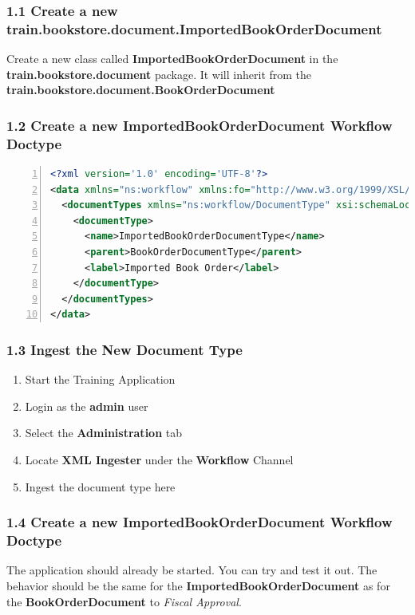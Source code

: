\subsubsection*{1.1 Create a new
  train.bookstore.document.ImportedBookOrderDocument}
Create a new class called \textbf{ImportedBookOrderDocument} in the
\textbf{train.bookstore.document} package. It will inherit from the
\textbf{train.bookstore.document.BookOrderDocument}

\subsubsection*{1.2 Create a new ImportedBookOrderDocument Workflow
  Doctype}
\begin{lstlisting}[numbers=left,language=xml,basicstyle=\scriptsize,backgroundcolor=\color{ubergray},caption={New
  ImportedBookOrderDocumentType},frame=single,breaklines=true]
<?xml version='1.0' encoding='UTF-8'?> 
<data xmlns="ns:workflow" xmlns:fo="http://www.w3.org/1999/XSL/Format" xmlns:xsi="http://www.w3.org/2001/XMLSchema-instance" xsi:schemaLocation="ns:workflow resource:WorkflowData">
  <documentTypes xmlns="ns:workflow/DocumentType" xsi:schemaLocation="ns:workflow/DocumentType resource:DocumentType">
    <documentType>
      <name>ImportedBookOrderDocumentType</name>
      <parent>BookOrderDocumentType</parent>
      <label>Imported Book Order</label>
    </documentType>
  </documentTypes>
</data>
\end{lstlisting}

\subsubsection*{1.3 Ingest the New Document Type}
\begin{enumerate}
  \item Start the Training Application
  \item Login as the \textbf{admin} user
  \item Select the \textbf{Administration} tab
  \item Locate \textbf{XML Ingester} under the \textbf{Workflow}
    Channel
  \item Ingest the document type here
\end{enumerate}

\subsubsection*{1.4 Create a new ImportedBookOrderDocument Workflow
  Doctype}
The application should already be started. You can try and test it
out. The behavior should be the same for the
\textbf{ImportedBookOrderDocument} as for the
\textbf{BookOrderDocument} to \emph{Fiscal Approval}.

